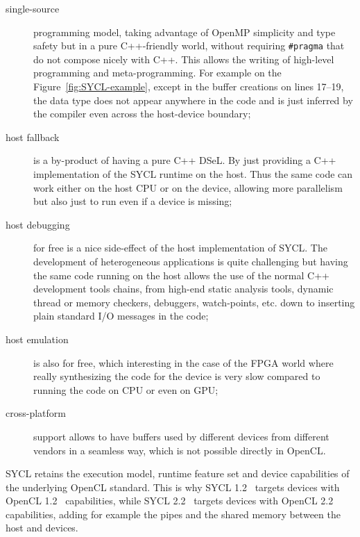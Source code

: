 \documentclass[sigplan, review]{acmart}
\begin{document}
\begin{description}
\item[single-source] programming model, taking advantage of OpenMP
  simplicity and type safety but in a pure C++-friendly world, without
  requiring \lstinline{#pragma} that do not compose nicely with
  C++. This allows the writing of high-level programming and
  meta-programming. For example on the Figure~\ref{fig:SYCL-example},
  except in the buffer creations on lines 17--19, the data type does
  not appear anywhere in the code and is just inferred by the compiler
  even across the host-device boundary;

\item[host fallback] is a by-product of having a pure C++ DSeL. By
  just providing a C++ implementation of the SYCL runtime on the
  host. Thus the same code can work either on the host CPU or on the
  device, allowing more parallelism but also just to run even if a
  device is missing;

\item[host debugging] for free is a nice side-effect of the host
  implementation of SYCL. The development of heterogeneous
  applications is quite challenging but having the same code running
  on the host allows the use of the normal C++ development tools
  chains, from high-end static analysis tools, dynamic thread or
  memory checkers, debuggers, watch-points, etc.  down to inserting
  plain standard I/O messages in the code;

\item[host emulation] is also for free, which interesting in the case
  of the FPGA world where really synthesizing the code for the device
  is very slow compared to running the code on CPU or even on GPU;

\item[cross-platform] support allows to have buffers used by different
  devices from different vendors in a seamless way, which is not
  possible directly in OpenCL.


\end{description}

SYCL retains the execution model, runtime feature set and device
capabilities of the underlying OpenCL standard. This is why SYCL
1.2~\cite{SYCL-1.2} targets devices with OpenCL
1.2~\cite{OpenCL-API+C-1.2} capabilities, while SYCL
2.2~\cite{SYCL-2.2-provisional} targets devices with OpenCL
2.2~\cite{OpenCL-API-2.2-provisional} capabilities, adding for example
the pipes and the shared memory between the host and devices.
\end{document}
